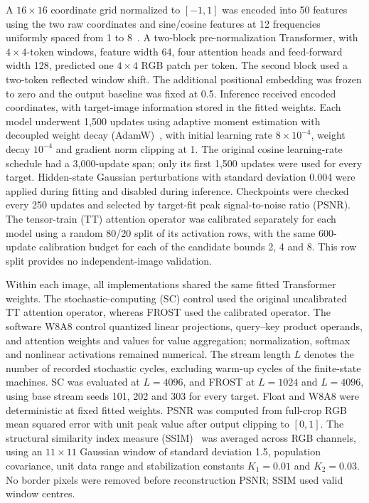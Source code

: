 \documentclass[pdflatex,sn-mathphys-num]{sn-jnl}
\theoremstyle{thmstyleone}
\theoremstyle{thmstyletwo}
\theoremstyle{thmstylethree}
\begin{document}
A $16\times16$ coordinate grid normalized to $[-1,1]$ was encoded into
50 features using the two raw coordinates and sine/cosine features at
12 frequencies uniformly spaced from 1 to 8~\cite{tancik2020fourfeat}.
A two-block pre-normalization Transformer, with $4\times4$-token windows,
feature width 64, four attention heads and feed-forward width 128,
predicted one $4\times4$ RGB patch per token. The second block used a
two-token reflected window shift. The additional positional embedding was
frozen to zero and the output baseline was fixed at 0.5. Inference received
encoded coordinates, with target-image information stored in the fitted weights.
Each model underwent 1,500 updates using adaptive moment estimation with
decoupled weight decay (AdamW)~\cite{loshchilov2019decoupled}, with
initial learning rate $8\times10^{-4}$, weight decay $10^{-4}$ and gradient
norm clipping at 1. The original cosine learning-rate schedule had a
3,000-update span; only its first 1,500 updates were used for every target.
Hidden-state Gaussian perturbations with standard deviation 0.004 were
applied during fitting and disabled during inference. Checkpoints were
checked every 250 updates and selected by target-fit peak signal-to-noise
ratio (PSNR).
The tensor-train (TT) attention operator was calibrated separately for each
model using a random 80/20 split of its activation rows, with the same
600-update calibration budget for each of the candidate bounds 2, 4 and 8.
This row split provides no independent-image validation.

Within each image, all implementations shared the same fitted Transformer
weights. The stochastic-computing (SC) control used the original
uncalibrated TT attention operator, whereas FROST used the calibrated
operator. The software W8A8 control quantized linear projections,
query--key product operands, and attention weights and values for value
aggregation; normalization, softmax and nonlinear activations remained
numerical. The stream length $L$ denotes the number of recorded stochastic
cycles, excluding warm-up cycles of the finite-state machines.
SC was evaluated at $L=4096$, and FROST at
$L=1024$ and $L=4096$, using base stream seeds 101, 202 and 303 for
every target. Float and W8A8 were deterministic at fixed fitted weights.
PSNR was computed from full-crop RGB mean
squared error with unit peak value after output clipping to $[0,1]$.
The structural similarity index measure
(SSIM)~\cite{wang2004ssim} was averaged across RGB channels, using an
$11\times11$ Gaussian window of standard deviation 1.5, population
covariance, unit data range and stabilization constants $K_1=0.01$
and $K_2=0.03$. No border pixels were removed before reconstruction PSNR;
SSIM used valid window centres.
\end{document}
